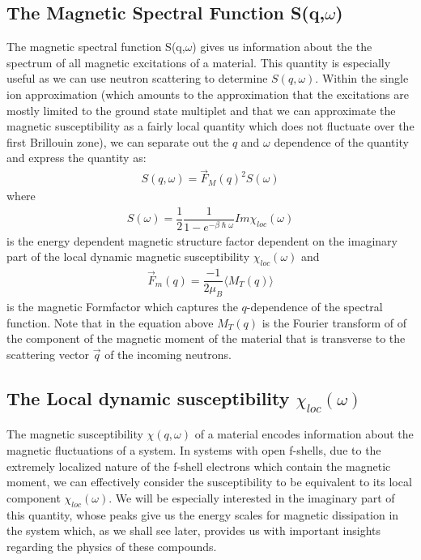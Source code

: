 \documentclass[10pt]{ruthesis}
\begin{document}
{\subsection{The Magnetic Spectral Function S(q,$\omega$)}
The magnetic spectral function S(q,$\omega$) gives us information about the the spectrum of all magnetic excitations of a material. This quantity is especially useful as we can use neutron scattering to determine $S(q, \omega)$. Within the single ion approximation (which amounts to the approximation that the excitations are mostly limited to the ground state multiplet and that we can approximate the magnetic susceptibility as a fairly local quantity which does not fluctuate over the first Brillouin zone), we can separate out the $q$ and $\omega$ dependence of the quantity and express the quantity as:
\begin{align}
S(q,\omega)=\vec{F}_{M}(q)^{2} S(\omega)
\end{align}
where
\begin{align}
S(\omega)=\dfrac{1}{2}\dfrac{1}{1-e^{-\beta\hslash\omega}}Im \chi_{loc}(\omega)
\end{align}
is the energy dependent magnetic structure factor dependent on the imaginary part of the local dynamic magnetic susceptibility $\chi_{loc}(\omega)$ and
\begin{align}
\vec{F}_{m}(q)=\dfrac{-1}{2\mu_{B}}\langle M_{T}(q) \rangle
\end{align}
is the magnetic Formfactor which captures the $q$-dependence of the spectral function. Note that in the equation above $M_{T}(q)$ is the  Fourier transform of  of the component of the magnetic moment of the material that is transverse to the scattering vector $\vec{q}$ of the incoming neutrons.

\subsection{The Local dynamic susceptibility $\chi_{loc}(\omega)$ }
The magnetic susceptibility $\chi(q,\omega)$ of a material encodes information about the magnetic fluctuations of a system. In systems with open f-shells, due to the extremely localized nature of the f-shell electrons which contain the magnetic moment, we can effectively consider the susceptibility to be equivalent to its local component $\chi_{loc}(\omega)$. We will be especially interested in the imaginary part of this quantity, whose peaks give us the energy scales for magnetic dissipation in the system which, as we shall see later, provides us with important insights regarding the physics of these compounds.

}
\end{document}
